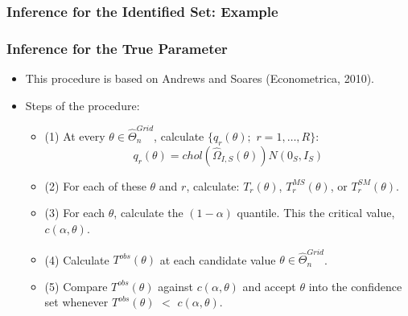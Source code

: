 \documentclass[10pt,letterpaper]{beamer}
\begin{document}
\begin{frame}
\frametitle{Inference for the Identified Set: Example}

\begin{figure}[h!]
\begin{center}
\end{center}
\end{figure}	
\end{frame}
\begin{frame}
\frametitle{Inference for the True Parameter}

\begin{itemize}
	\item This procedure is based on Andrews and Soares (Econometrica, 2010).
	\item Steps of the procedure:
	\begin{itemize}
		\item (1) At every $\theta\in\widehat{\Theta}_{n}^{Grid}$, calculate $\{q_{r}(\theta);$ $r=1,\dots,R\}$:
		\begin{equation*}
		q_{r}(\theta)=chol(\widehat{\Omega}_{I,S}(\theta))N(0_{S},I_{S})
		\end{equation*}
		\item (2) For each of these $\theta$ and $r$, calculate: $T_{r}(\theta)$, $T_{r}^{MS}(\theta)$, or $T_{r}^{SM}(\theta)$.
		\item (3) For each $\theta$, calculate the $(1-\alpha)$ quantile. This the critical value, $c(\alpha,\theta)$.
		\item (4) Calculate $T^{obs}(\theta)$ at each candidate value $\theta\in\widehat{\Theta}_{n}^{Grid}$.
		\item (5) Compare $T^{obs}(\theta)$ against $c(\alpha,\theta)$ and accept $\theta$ into the confidence set whenever $T^{obs}(\theta)$ $<$ $c(\alpha,\theta)$.
	\end{itemize}
\end{itemize}
\end{frame}
\end{document}

